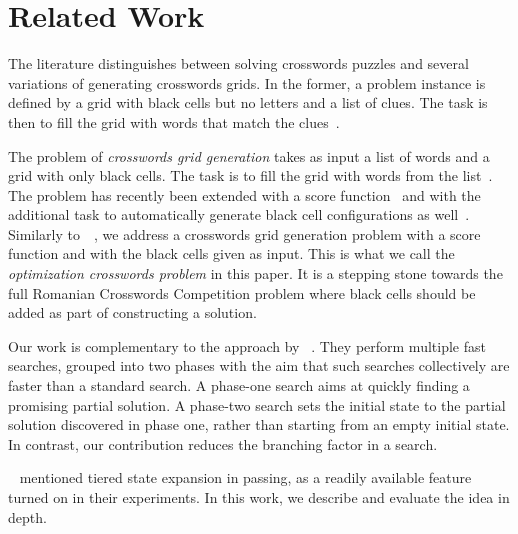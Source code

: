 \section{Related Work}
\label{sec::relwork}



The literature distinguishes between solving crosswords puzzles
and several variations of generating crosswords grids.
In the former, a problem instance is defined by a grid with black cells but no letters
and a list of clues.
The task is then to fill the grid with words that match the 
clues~\cite{DBLP:journals/ai/LittmanKS02,DBLP:conf/aaai/ErnandesAG05,DBLP:journals/jair/Ginsberg11,Chen-icaps22}.

The problem of \emph{crosswords grid generation} takes as input
a list of words and
a grid with only black cells.
The task is to fill the grid with words from the
list~\cite{MAZLACK19761,10.5555/1865499.1865531,botea-modref07,anbulagan-botea-cp08}.
The problem has recently been extended with a score function~\cite{DBLP:conf/socs/BoteaB21}
and with the additional task to automatically generate black cell configurations as well~\cite{DBLP:conf/cig/BulitkoB21}.
%
Similarly to~\citeauthor{DBLP:conf/socs/BoteaB21}~,
we address a crosswords grid generation problem
with a score function and with the black cells given as input.
This is what we call the {\em optimization crosswords problem} in this paper.
It is a stepping stone towards the full Romanian Crosswords Competition problem
where black cells should be added as part of constructing a solution.

Our work is complementary
to the approach by \citeauthor{DBLP:conf/socs/BoteaB21}~.
They perform multiple fast searches, grouped into two phases with the aim that
such searches collectively are faster than a standard search.
A phase-one search aims at
quickly finding a promising partial solution.
A phase-two search sets the initial state to the partial solution discovered in phase one,
rather than starting from an empty initial state.
In contrast, our contribution reduces the branching factor in a search.

\citeauthor{DBLP:conf/socs/BoteaB21}~ mentioned 
tiered state expansion in passing, as a readily available feature turned on in their
experiments. In this work, we describe and evaluate the idea in depth.


